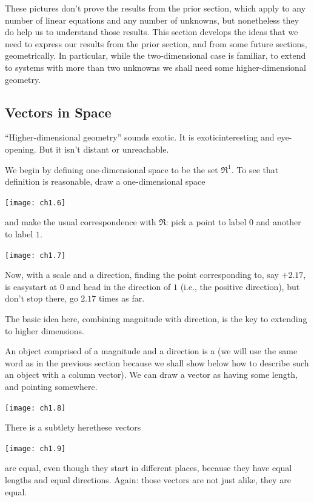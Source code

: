 These pictures don't prove the results from the prior section, which apply
to any number of linear equations and any number of unknowns, but
nonetheless they do help us to understand those results.
This section develops the ideas that we need to
express our results from the prior section, and from some future sections,
geometrically. 
In particular, while
the two-dimensional case is familiar, to extend to systems with
more than two unknowns we shall need some higher-dimensional geometry.














\subsection{Vectors in Space}
``Higher-dimensional geometry'' sounds exotic.
It is exotic\Dash interesting and eye-opening.
But it isn't distant or unreachable.

We begin by defining one-dimensional space to be the set \( \Re^1 \).
To see that definition is reasonable, draw a one-dimensional space
\begin{center}
  \texttt{[image: ch1.6]}
\end{center}
and make the usual correspondence with \( \Re \):
pick a point to label $0$ and another to label $1$.
\begin{center}
  \texttt{[image: ch1.7]}
\end{center}
Now, with a scale and a direction,
finding the point corresponding to, say
\( +2.17 \), is easy\Dash start at \( 0 \) and head in the direction of \( 1 \)
(i.e., the
positive direction), but don't stop there, go \( 2.17 \) times as far.

The basic idea here, combining magnitude with direction, is the
key to extending to higher dimensions.

An object comprised of a magnitude and a direction is a
(we will use the same word as in the previous section because we shall show
below how to describe such
an object with a column vector).
We can draw a vector as having some length, and pointing somewhere.
\begin{center}
  \texttt{[image: ch1.8]}
\end{center}
There is a subtlety here\Dash these vectors
\begin{center}
  \texttt{[image: ch1.9]}
\end{center}
are equal, even though they start in different places,
because they have equal lengths and equal directions.
Again: those vectors are not just alike, they are equal.

